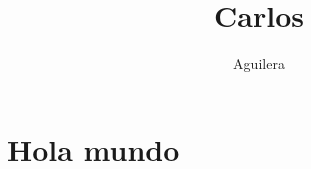 \documentclass[a4paper]{article}
\title{Carlos}
\author{Aguilera}
\begin{document}
\section{Hola mundo}
\end{document}
